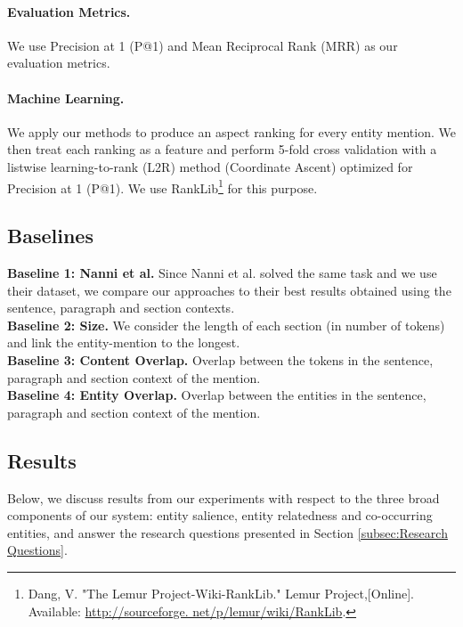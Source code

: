 \documentclass[sigconf,authordraft]{acmart}
\begin{document}
\paragraph{\textbf{Evaluation Metrics.}} We use Precision at 1 (P@1) and Mean Reciprocal Rank (MRR) as our evaluation metrics. %

\paragraph{\textbf{Machine Learning.}}
We apply our methods to produce an aspect ranking for every entity mention. We then treat each ranking as a feature and perform 5-fold cross validation with a listwise learning-to-rank (L2R) method (Coordinate Ascent) optimized for Precision at 1 (P@1). We use RankLib\footnote{Dang, V. "The Lemur Project-Wiki-RankLib." Lemur Project,[Online]. Available: \url{http://sourceforge. net/p/lemur/wiki/RankLib}.} for this purpose. 

\subsection{Baselines}
\label{subsec:Baselines}

\textbf{Baseline 1: Nanni et al.} Since Nanni et al. \cite{nanni2018entity} solved the same task and we use their dataset, we compare our approaches to their best results obtained using the sentence, paragraph and section contexts.  \\
\textbf{Baseline 2: Size.} We consider the length of each section (in number of tokens) and link the entity-mention to the longest. \\
\textbf{Baseline 3: Content Overlap.} Overlap between the tokens in the sentence, paragraph and section context of the mention. \\
\textbf{Baseline 4: Entity Overlap.} Overlap between the entities in the sentence, paragraph and section context of the mention. \\

\subsection{Results}
\label{subsec:Results}
Below, we discuss results from our experiments with respect to the three broad components of our system: entity salience, entity relatedness and co-occurring entities, and answer the research questions presented in Section \ref{subsec:Research Questions}.
\end{document}
